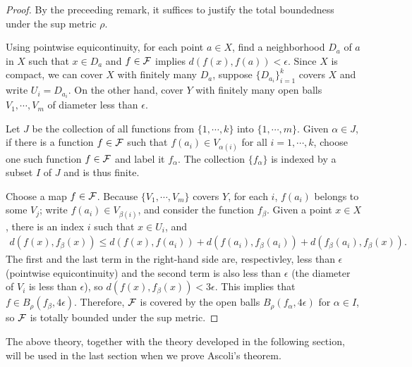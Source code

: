\begin{proof}
    By the preceeding remark, it suffices to justify the total boundedness under the sup metric $\rho$.

    Using pointwise equicontinuity, for each point $a\in X$, find a neighborhood $D_a$ of $a$ in $X$ such that $x\in D_a$ and $f\in{\mathcal{F}}$ implies $d(f(x), f(a))<\epsilon$.
    Since $X$ is compact, we can cover $X$ with finitely many $D_a$, suppose $\{D_{a_i}\}_{i=1}^k$ covers $X$ and write $U_i=D_{a_i}$.
    On the other hand, cover $Y$ with finitely many open balls $V_1, \cdots, V_m$ of diameter less than $\epsilon$.

    Let $J$ be the collection of all functions from $\{1, \cdots, k\}$ into $\{1, \cdots, m\}$.
    Given $\alpha\in J$, if there is a function $f\in{\mathcal{F}}$ such that $f(a_i)\in V_{\alpha(i)}$ for all $i=1, \cdots, k$, choose one such function $f\in{\mathcal{F}}$ and label it $f_\alpha$.
    The collection $\{f_\alpha\}$ is indexed by a subset $I$ of $J$ and is thus finite.
    
    Choose a map $f\in{\mathcal{F}}$.
    Because $\{V_1, \cdots, V_m\}$ covers $Y$, for each $i$, $f(a_i)$ belongs to some $V_j$; write $f(a_i)\in V_{\beta(i)}$, and consider the function $f_\beta$.
    Given a point $x\in X$, there is an index $i$ such that $x\in U_i$, and
    \begin{align*}
        d(f(x), f_\beta(x)) \leq d(f(x), f(a_i))+d(f(a_i), f_\beta(a_i))+d(f_\beta(a_i), f_\beta(x)).
    \end{align*}
    The first and the last term in the right-hand side are, respectivley, less than $\epsilon$ (pointwise equicontinuity) and the second term is also less than $\epsilon$ (the diameter of $V_i$ is less than $\epsilon$), so $d(f(x), f_\beta(x))<3\epsilon$.
    This implies that $f\in B_\rho(f_\beta, 4\epsilon)$.
    Therefore, ${\mathcal{F}}$ is covered by the open balls $B_\rho(f_\alpha, 4\epsilon)$ for $\alpha\in I$, so ${\mathcal{F}}$ is totally bounded under the sup metric.
\end{proof}

The above theory, together with the theory developed in the following section, will be used in the last section when we prove Ascoli's theorem.